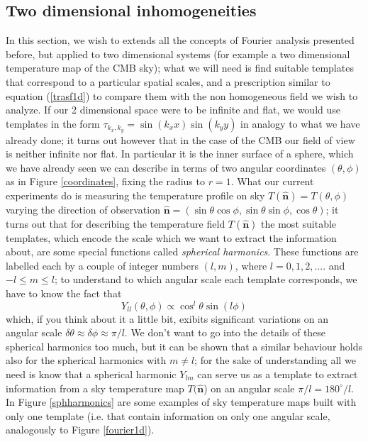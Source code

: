 \subsection{Two dimensional inhomogeneities}
\label{2dsection}
In this section, we wish to extends all the concepts of Fourier analysis presented before, but applied to two dimensional systems (for example a two dimensional temperature map of the CMB sky); what we will need is find suitable templates that correspond to a particular spatial scales, and a prescription similar to equation (\ref{trasf1d}) to compare them with the non homogeneous field we wish to analyze. If our 2 dimensional space were to be infinite and flat, we would use templates in the form $\tau_{k_x,k_y}=\sin{ (k_x x)}\sin{(k_y y)}$ in analogy to what we have already done; it turns out however that in the case of the CMB our field of view is neither infinite nor flat. In particular it is the inner surface of a sphere, which we have already seen we can describe in terms of two angular coordinates $(\theta,\phi)$ as in Figure \ref{coordinates}, fixing the radius to $r=1$. What our current experiments do is measuring the temperature profile on sky $T(\mathbf{\hat{n}})=T(\theta,\phi)$ varying the 
direction of observation $\mathbf{\hat{n}}=(\sin \theta \cos \phi,\sin \theta \sin \phi,\cos \theta)$; it turns out that for describing the temperature field $T(\mathbf{\hat{n}})$ the most suitable templates, which encode the scale which we want to extract the information about, are some special functions called \textit{spherical harmonics}. These functions are labelled each by a couple of integer numbers $(l,m)$, where $l=0,1,2,....$ and $-l\leq m \leq l$; to understand to which angular scale each template corresponds, we have to know the fact that
\begin{equation}
Y_{ll}(\theta,\phi)\propto \cos^l\theta \sin{(l\phi)}
\end{equation}
which, if you think about it a little bit, exibits significant variations on an angular scale $\delta \theta \approx \delta\phi \approx \pi/l$. We don't want to go into the details of these spherical harmonics too much, but it can be shown that a similar behaviour holds also for the spherical harmonics with $m\neq l$; for the sake of understanding all we need is know that a spherical harmonic $Y_{lm}$ can serve us as a template to extract information from a sky temperature map $T(\mathbf{\hat{n}}$) on an angular scale $\pi/l=180^\circ/l$. In Figure \ref{sphharmonics} are some examples of sky temperature maps built with only one template (i.e. that contain information on only one angular scale, analogously to Figure \ref{fourier1d}). 
